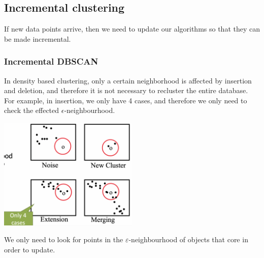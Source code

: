 \subsection{Incremental clustering}
    If new data points arrive, then we need to update our algorithms so that they can be made incremental.
    
\subsubsection{Incremental DBSCAN}
    In density based clustering, only a certain neighborhood is affected by insertion and deletion, and therefore it is not necessary to recluster the entire database. For example, in insertion, we only have 4 cases, and therefore we only need to check the effected $\epsilon$-neighbourhood. 
    
       
    \begin{center}
        \includegraphics[width=0.5\textwidth]{images/4cases.png}
    \end{center}
    
    We only need to look for points in the $\varepsilon$-neighbourhood of objects that core in order to update.